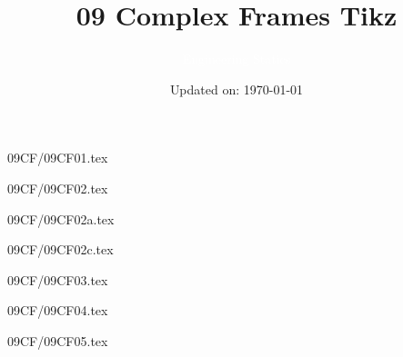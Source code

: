 \documentclass[9pt, xcolor={svgnames, x11names},professionalfonts]{beamer}
\title[09 Complex Frames Tikz]{\Huge 09 Complex Frames Tikz}
\subtitle[Engineering Statics]{\Large\textcolor{white}{Engineering Statics}}
\author{}
\date{\small Updated on: \today}
\def\scale{1}
\begin{document}

\begin{frame}[plain]    %
	\titlepage
\end{frame}




\begin{frame}{09CF/09CF01.tex}
	\def\scale{0.5}
	
\end{frame}


\begin{frame}{09CF/09CF02.tex}
	\def\scale{0.5}
	
\end{frame}


\begin{frame}{09CF/09CF02a.tex}
	\def\scale{0.5}
	
\end{frame}


\begin{frame}{09CF/09CF02c.tex}
	\def\scale{0.5}
	
\end{frame}


\begin{frame}{09CF/09CF03.tex}
	\def\scale{0.5}
	
\end{frame}




\begin{frame}{09CF/09CF04.tex}
	\def\scale{0.5}
	
\end{frame}


\begin{frame}{09CF/09CF05.tex}
	
\end{frame}
\end{document}
